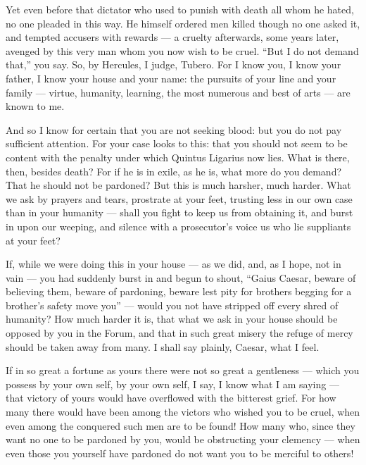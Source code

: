  Yet even before that dictator who used to punish with death all whom he hated, no one pleaded in this way. He himself ordered men killed though no one asked it, and tempted accusers with rewards --- a cruelty afterwards, some years later, avenged by this very man whom you now wish to be cruel. ``But I do not demand that,'' you say. So, by Hercules, I judge, Tubero. For I know you, I know your father, I know your house and your name: the pursuits of your line and your family --- virtue, humanity, learning, the most numerous and best of arts --- are known to me.

 And so I know for certain that you are not seeking blood: but you do not pay sufficient attention. For your case looks to this: that you should not seem to be content with the penalty under which Quintus Ligarius now lies. What is there, then, besides death? For if he is in exile, as he is, what more do you demand? That he should not be pardoned? But this is much harsher, much harder. What we ask by prayers and tears, prostrate at your feet, trusting less in our own case than in your humanity --- shall you fight to keep us from obtaining it, and burst in upon our weeping, and silence with a prosecutor's voice us who lie suppliants at your feet?

 If, while we were doing this in your house --- as we did, and, as I hope, not in vain --- you had suddenly burst in and begun to shout, ``Gaius Caesar, beware of believing them, beware of pardoning, beware lest pity for brothers begging for a brother's safety move you'' --- would you not have stripped off every shred of humanity? How much harder it is, that what we ask in your house should be opposed by you in the Forum, and that in such great misery the refuge of mercy should be taken away from many. I shall say plainly, Caesar, what I feel.

 If in so great a fortune as yours there were not so great a gentleness --- which you possess by your own self, by your own self, I say, I know what I am saying --- that victory of yours would have overflowed with the bitterest grief. For how many there would have been among the victors who wished you to be cruel, when even among the conquered such men are to be found! How many who, since they want no one to be pardoned by you, would be obstructing your clemency --- when even those you yourself have pardoned do not want you to be merciful to others!

